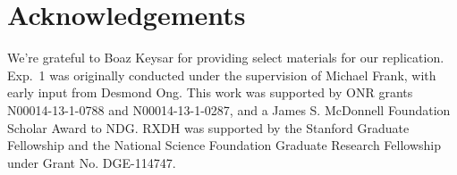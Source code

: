 \documentclass[10pt,letterpaper]{article}
\begin{document}
\section{Acknowledgements}

\small We're grateful to Boaz Keysar for providing select materials for our replication. Exp.~1 was originally conducted under the supervision of Michael Frank, with early input from Desmond Ong. This work was supported by ONR grants N00014-13-1-0788 and N00014-13-1-0287,  and a James S. McDonnell Foundation Scholar Award to NDG. RXDH was supported by the Stanford Graduate Fellowship and the National Science Foundation Graduate Research Fellowship under Grant No. DGE-114747. 



\setlength{\bibleftmargin}{.125in}
\setlength{\bibindent}{-\bibleftmargin}


\end{document}
